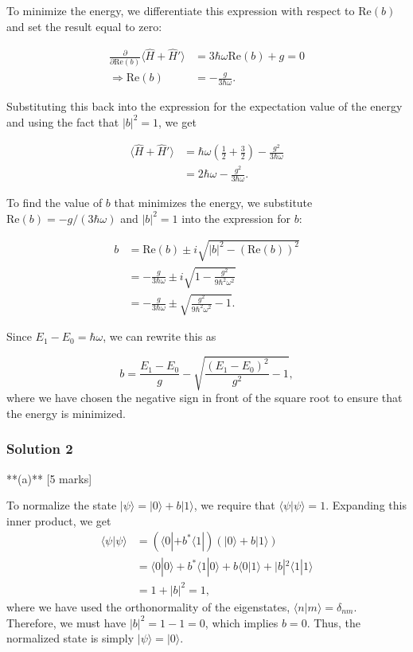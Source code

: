 \documentclass{article}
\begin{document}
To minimize the energy, we differentiate this expression with respect to \(\text{Re}(b)\) and set the result equal to zero:

\begin{align*}
\frac{\partial}{\partial \text{Re}(b)} \langle \hat{H} + \hat{H}' \rangle &= 3 \hbar \omega \text{Re}(b) + g = 0 \\
\Rightarrow \text{Re}(b) &= -\frac{g}{3 \hbar \omega}.
\end{align*}

Substituting this back into the expression for the expectation value of the energy and using the fact that \(|b|^2 = 1\), we get

\begin{align*}
\langle \hat{H} + \hat{H}' \rangle &= \hbar \omega \left( \frac{1}{2} + \frac{3}{2} \right) - \frac{g^2}{3 \hbar \omega} \\
&= 2 \hbar \omega - \frac{g^2}{3 \hbar \omega}.
\end{align*}

To find the value of \(b\) that minimizes the energy, we substitute \(\text{Re}(b) = -g/(3 \hbar \omega)\) and \(|b|^2 = 1\) into the expression for \(b\):

\begin{align*}
b &= \text{Re}(b) \pm i \sqrt{|b|^2 - (\text{Re}(b))^2} \\
&= -\frac{g}{3 \hbar \omega} \pm i \sqrt{1 - \frac{g^2}{9 \hbar^2 \omega^2}} \\
&= -\frac{g}{3 \hbar \omega} \pm \sqrt{\frac{g^2}{9 \hbar^2 \omega^2} - 1}.
\end{align*}

Since \(E_1 - E_0 = \hbar \omega\), we can rewrite this as

\[
b = \frac{E_1 - E_0}{g} - \sqrt{\frac{(E_1 - E_0)^2}{g^2} - 1},
\]
where we have chosen the negative sign in front of the square root to ensure that the energy is minimized.

\subsubsection{Solution 2}
**(a)**  [5 marks]

To normalize the state \(|\psi\rangle = |0\rangle + b |1\rangle\), we require that \(\langle \psi | \psi \rangle = 1\). Expanding this inner product, we get
\begin{align*}
\langle \psi | \psi \rangle &= (\langle 0 | + b^* \langle 1 |)(|0\rangle + b |1\rangle) \\
&= \langle 0 | 0 \rangle + b^* \langle 1 | 0 \rangle + b \langle 0 | 1 \rangle + |b|^2 \langle 1 | 1 \rangle \\
&= 1 + |b|^2 = 1,
\end{align*}
where we have used the orthonormality of the eigenstates, \(\langle n | m \rangle = \delta_{nm}\).  Therefore, we must have \(|b|^2 = 1 - 1 = 0\), which implies \(b = 0\).  Thus, the normalized state is simply \(|\psi\rangle = |0\rangle\).
\end{document}
